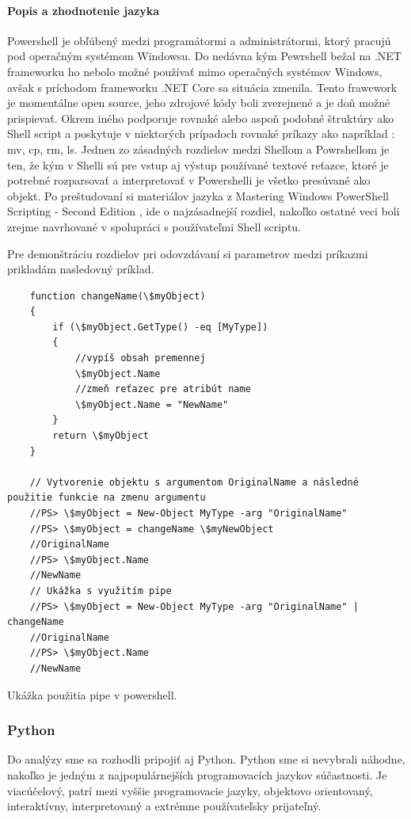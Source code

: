 \paragraph{Popis a zhodnotenie jazyka}
Powershell je obľúbený medzi programátormi a administrátormi, ktorý pracujú pod operačným systémom Windowsu. Do nedávna kým Pewrshell bežal na .NET frameworku ho nebolo možné používať mimo operačných systémov Windows, avšak s príchodom frameworku .NET Core sa situácia zmenila. Tento frawework je momentálne open source, jeho zdrojové kódy boli zverejnené a je doň možné prispievať. Okrem iného podporuje rovnaké alebo aspoň podobné štruktúry ako Shell script a poskytuje v niektorých prípadoch rovnaké príkazy ako napríklad : mv, cp, rm, ls. Jednen zo zásadných rozdielov medzi Shellom a Powrshellom je ten, že kým v Shelli sú pre vstup aj výstup používané textové reťazce, ktoré je potrebné rozparsovať a interpretovať v Powershelli je všetko presúvané ako objekt. Po preštudovaní si materiálov jazyka z Mastering Windows PowerShell Scripting - Second Edition \cite{psbook}, ide o najzásadnejší rozdiel, nakoľko ostatné veci boli zrejme navrhované v spolupráci s používateľmi Shell scriptu.

Pre demonštráciu rozdielov pri odovzdávaní si parametrov medzi príkazmi prikladám nasledovný príklad.
\newpage
\begin{algorithm}
	\begin{verbatim}
	function changeName(\$myObject)
	{
		if (\$myObject.GetType() -eq [MyType])
		{
			//vypíš obsah premennej
			\$myObject.Name
			//zmeň reťazec pre atribút name
			\$myObject.Name = "NewName"
		}
		return \$myObject
	}
	
	// Vytvorenie objektu s argumentom OriginalName a následné použitie funkcie na zmenu argumentu
	//PS> \$myObject = New-Object MyType -arg "OriginalName"
	//PS> \$myObject = changeName \$myNewObject
	//OriginalName
	//PS> \$myObject.Name
	//NewName
	// Ukážka s využitím pipe
	//PS> \$myObject = New-Object MyType -arg "OriginalName" | changeName
	//OriginalName
	//PS> \$myObject.Name
	//NewName
	\end{verbatim}
	\caption{Ukážka použitia pipe v powershell. \cite{netalg}}
	\label{alg:gen}
\end{algorithm}

\subsubsection{Python}
\indent Do analýzy sme sa rozhodli pripojiť aj Python. Python sme si nevybrali náhodne, nakoľko je jedným z najpopulárnejších programovacích jazykov súčastnosti. Je viacúčelový, patrí mezi vyššie programovacie jazyky, objektovo orientovaný, interaktívny, interpretovaný a extrémne používateľsky prijateľný.\cite{python}
